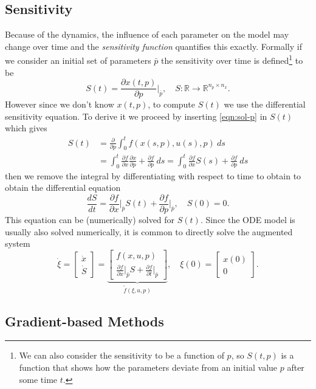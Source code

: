 \documentclass[a4paper]{article}
\theoremstyle{plain}
\theoremstyle{definition}
\theoremstyle{remark}
\begin{document}
\subsection{Sensitivity}

Because of the dynamics, the influence of each parameter on the model may
change over time and the \emph{sensitivity function} quantifies this exactly.
Formally if we consider an initial set of parameters $\bar{p}$ the sensitivity
over time is defined\footnote{We can also consider the sensitivity to be a
function of $p$, so $S(t, p)$ is a function that shows how the parameters
deviate from an initial value $p$ after some time $t$.} to be
\[
  S(t) = \frac{\partial x(t, p)}{\partial p} \bigg|_{\bar{p}},
  \quad S: \mathbb{R} \to \mathbb{R}^{n_p \times n_x}.
\]
However since we don't know $x(t, p)$, to compute $S(t)$ we use the
differential sensitivity equation. To derive it we proceed by inserting
\eqref{eqn:sol-p} in $S(t)$ which gives
\begin{align*}
  S(t) &= \frac{\partial}{\partial p} \int_0^t f(x(s, p), u(s), p) ~ ds \\
  &= \int_0^t \frac{\partial f}{\partial x} \frac{\partial x}{\partial p}
   + \frac{\partial f}{\partial p} ~ ds
    = \int_0^t \frac{\partial f}{\partial x} S(s)
      + \frac{\partial f}{\partial p} ~ ds
\end{align*}
then we remove the integral by differentiating with respect to time to obtain
to obtain the differential equation
\[
  \frac{dS}{dt} = \frac{\partial f}{\partial x} \bigg|_{\bar{p}} S(t)
    + \frac{\partial f}{\partial p} \bigg|_{\bar{p}}, \quad S(0) = 0.
\]
This equation can be (numerically) solved for $S(t)$. Since the ODE model is
usually also solved numerically, it is common to directly solve the augmented
system
\[
  \dot{\xi} =
  \begin{bmatrix} \dot{x} \\ \dot{S} \end{bmatrix} =
  \underbrace{\begin{bmatrix}
    f(x, u, p) \\
    \frac{\partial f}{\partial x} \big|_{\bar{p}} S
    + \frac{\partial f}{\partial t} \big|_{\bar{p}}
  \end{bmatrix}}_{\tilde{f}(\xi, u, p)},
  \quad \xi(0) = \begin{bmatrix}
    x(0) \\ 0
  \end{bmatrix}.
\]

\subsection{Gradient-based Methods}
\end{document}
